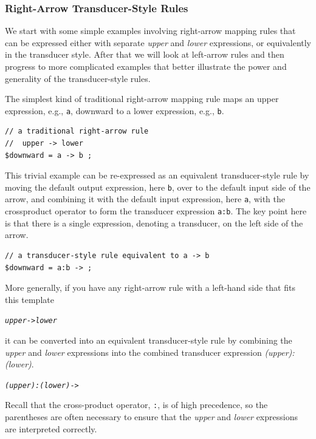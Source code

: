 \subsubsection{Right-Arrow Transducer-Style Rules}

We start with some simple examples involving right-arrow mapping rules that can be expressed either with separate
\emph{upper} and \emph{lower} expressions, or equivalently in the transducer style.  After that we
will look at left-arrow rules and then
progress to more complicated examples that better illustrate the power and generality of the
transducer-style rules.  

The simplest kind of traditional right-arrow mapping rule maps an upper
expression, e.g., \verb!a!, downward to a lower
expression, e.g., \verb!b!.  

\begin{Verbatim}
// a traditional right-arrow rule
//  upper -> lower
$downward = a -> b ;
\end{Verbatim}

\noindent
This trivial example can be re-expressed as an equivalent transducer-style rule by moving the default
output expression, here \verb!b!, over to the default input side of the arrow, and combining it with
the default input expression, here \verb!a!, with the crossproduct operator to form the transducer expression \verb!a:b!.
The key point here is that there is a single expression, denoting a transducer, on the left side of the arrow.

\begin{Verbatim}
// a transducer-style rule equivalent to a -> b
$downward = a:b -> ;
\end{Verbatim}

\noindent
More generally, if you have any right-arrow rule with a left-hand side that fits this template

\begin{alltt}
	\emph{upper} -> \emph{lower}
\end{alltt}

\noindent
it can be converted into an equivalent transducer-style rule by combining the \emph{upper} and
\emph{lower} expressions into the combined transducer expression \emph{(upper):(lower)}.

\begin{alltt}
	\emph{(upper):(lower)} ->
\end{alltt}

\noindent
Recall that the cross-product operator, \verb!:!, is of high precedence,
so the parentheses are often
necessary to ensure that the \emph{upper} and \emph{lower} expressions are interpreted correctly.

